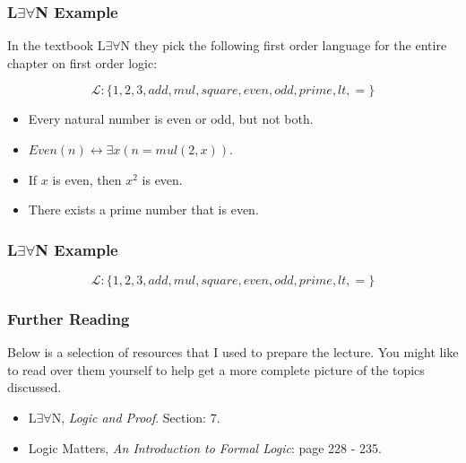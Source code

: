 \documentclass{beamer}
\theoremstyle{indentDefn} \newtheorem{defn}[]{Definition}
\begin{document}
\begin{frame}
	\frametitle{L$\exists\forall$N Example}
	
	In the textbook L$\exists\forall$N they pick the following first order language for the entire chapter on first order logic: 
	
	$$\mathcal{L}: \{1,2,3,add,mul,square,even,odd,prime,lt,=\}$$
	
	\begin{itemize}
		\item Every natural number is even or odd, but not both. \vspace{0.7cm}
		
		\item $Even(n) \leftrightarrow \exists x (n = mul(2,x))$. \vspace{0.7cm}
		
		\item If $x$ is even, then $x^{2}$ is even. \vspace{0.7cm}
		
		\item There exists a prime number that is even. \vspace{0.7cm}
				
	\end{itemize}
\end{frame}

\begin{frame}
	\frametitle{L$\exists\forall$N Example}
	
	$$\mathcal{L}: \{1,2,3,add,mul,square,even,odd,prime,lt,=\}$$
	
	\vspace{7cm}
	
	
	
\end{frame}


\begin{frame}
  \frametitle{Further Reading}


Below is a selection of resources that I used to prepare the lecture. You might like to read over them yourself to help get a more complete picture of the topics discussed. 

\vspace{0.5cm}

\begin{itemize}
	\item L$\exists \forall$N, \emph{Logic and Proof}. Section: 7.
	\item Logic Matters, \emph{An Introduction to Formal Logic}: page 228 - 235.
\end{itemize}

\end{frame}
\end{document}

